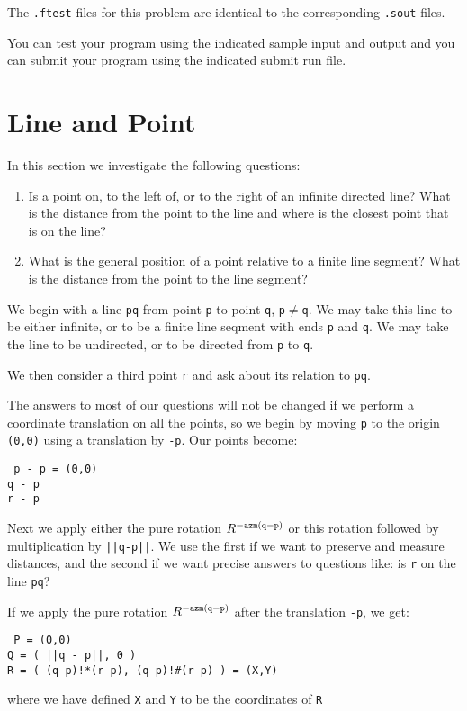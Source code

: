 \documentclass[12pt]{article}
\begin{document}
The {\tt .ftest} files for this problem are identical
to the corresponding {\tt .sout} files.

You can test your program using the indicated sample input and
output and you can submit your program using the indicated submit
run file.

\newpage

\section{Line and Point}\label{LINE-AND-POINT}
In this section we investigate the following questions:
\begin{enumerate}
\item Is a point on, to the left of, or to the right of
an infinite directed line?  What is the distance from the
point to the line and where is the closest point that is
on the line?
\item What is the general position of a point relative
to a finite line segment?  What is the distance from the
point to the line segment?
\end{enumerate}

We begin with a line {\tt pq} from point {\tt p} to point {\tt q},
{\tt p$\neq$q}.
We may take this line to be either infinite, or to be a finite
line seqment with ends {\tt p} and {\tt q}.  We may take the
line to be undirected, or to be directed from {\tt p} to {\tt q}.

We then consider a third point {\tt r} and ask about its relation
to {\tt pq}.

The answers to most of our questions will not be changed if we perform
a coordinate translation on all the points, so we begin by moving
{\tt p} to the origin {\tt (0,0)} using a translation by {\tt -p}.
Our points become:
\begin{center} \tt
p - p = (0,0) \\
q - p \\
r - p
\end{center}
Next we apply either the pure rotation $R^{\tt -azm(q-p)}$
or this rotation followed by multiplication by {\tt ||q-p||}.  We use
the first if we want to preserve and measure distances, and the
second if we want precise answers to questions like: is {\tt r} on the
line {\tt pq}?

If we apply the pure rotation $R^{\tt -azm(q-p)}$ after the translation
{\tt -p}, we get:
\begin{center} \tt
P = (0,0) \\
Q = ( ||q - p||, 0 ) \\
R = ( (q-p)!*(r-p), (q-p)!\#(r-p) ) = (X,Y)
\end{center}
where we have defined {\tt X} and {\tt Y} to be the coordinates of {\tt R}
\end{document}
